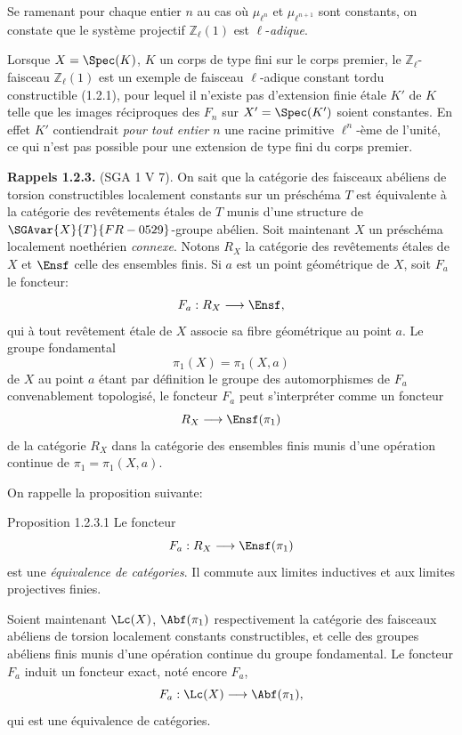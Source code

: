 Se ramenant pour chaque entier \(n\) au cas où \(\mu_{\ell^n}\) et \(\mu_{\ell^{n+1}}\) sont constants, on constate que le système projectif \(\mathbb{Z}_\ell(1)\) est \(\ell\)-\emph{adique}.

Lorsque \(X=\Spec(K)\), \(K\) un corps de type fini sur le corps premier, le \(\mathbb{Z}_\ell\)-faisceau \(\mathbb{Z}_\ell(1)\) est un exemple de faisceau \(\ell\)-adique constant tordu constructible (1.2.1), pour lequel il n'existe pas d'extension finie étale \(K'\) de \(K\) telle que les images réciproques des \(F_n\) sur \(X'=\Spec(K')\) soient constantes. En effet \(K'\) contiendrait \emph{pour tout entier} \(n\) une racine primitive \(\ell^n\)-ème de l'unité, ce qui n'est pas possible pour une extension de type fini du corps premier.

\textbf{Rappels 1.2.3.} (SGA 1 V 7). On sait que la catégorie des faisceaux abéliens de torsion constructibles localement constants sur un préschéma \(T\) est équivalente à la catégorie des revêtements étales de \(T\) munis d'une structure de \(\SGAvar{X}{T}{FR-0529}\)-groupe abélien. Soit maintenant \(X\) un préschéma localement noethérien \emph{connexe}. Notons \(R_X\) la catégorie des revêtements étales de \(X\) et \(\Ensf\) celle des ensembles finis. Si \(a\) est un point géométrique de \(X\), soit \(F_a\) le foncteur:
\[
F_a:R_X\longrightarrow \Ensf,
\]
qui à
tout revêtement étale de \(X\) associe sa fibre géométrique au point \(a\). Le groupe fondamental
\[
\pi_1(X)=\pi_1(X,a)
\]
de \(X\) au point \(a\) étant par définition le groupe des automorphismes de \(F_a\) convenablement topologisé, le foncteur \(F_a\) peut s'interpréter comme un foncteur
\[
R_X\longrightarrow \Ensf(\pi_1)
\]
de la catégorie \(R_X\) dans la catégorie des ensembles finis munis d'une opération continue de \(\pi_1=\pi_1(X,a)\).

On rappelle la proposition suivante:

\begin{statement}{Proposition 1.2.3.1}
Le foncteur
\[
F_a:R_X\longrightarrow \Ensf(\pi_1)
\]
est une \emph{équivalence de catégories}. Il commute aux limites inductives et aux limites projectives finies.
\end{statement}

Soient maintenant \(\Lc(X)\), \(\Abf(\pi_1)\) respectivement la catégorie des faisceaux abéliens de torsion localement constants constructibles, et celle des groupes abéliens finis munis d'une opération continue du groupe fondamental. Le foncteur \(F_a\) induit un foncteur exact, noté encore \(F_a\),
\[
F_a:\Lc(X)\longrightarrow \Abf(\pi_1),
\]
qui est une équivalence de catégories.


